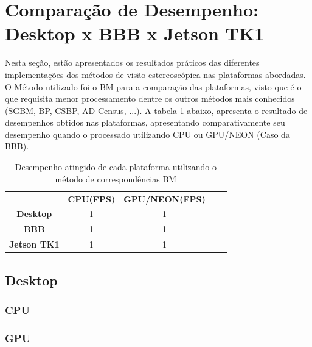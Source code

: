 \section{Comparação de Desempenho: Desktop x BBB x Jetson TK1}

Nesta seção, estão apresentados os resultados práticos das diferentes implementações dos métodos de visão estereoscópica nas plataformas abordadas. O Método utilizado foi o BM para a comparação das plataformas, visto que é o que requisita menor processamento dentre os outros métodos mais conhecidos (SGBM, BP, CSBP, AD Census, ...). A tabela \ref{resultsCPUGPU} abaixo, apresenta o resultado de desempenhos obtidos nas plataformas, apresentando comparativamente seu desempenho quando o processado utilizando CPU ou GPU/NEON (Caso da BBB).

\begin{table}[]
\centering
\caption{Desempenho atingido de cada plataforma utilizando o método de correspondências BM}
\label{resultsCPUGPU}
\begin{tabular}{c|c|c|ll}
\cline{2-3}
                                          & \textbf{CPU(FPS)} & \textbf{GPU/NEON(FPS)} &  &  \\ \cline{1-3}
\multicolumn{1}{|c|}{\textbf{Desktop}}    & 1                 & 1                      &  &  \\ \cline{1-3}
\multicolumn{1}{|c|}{\textbf{BBB}}        & 1                 & 1                      &  &  \\ \cline{1-3}
\multicolumn{1}{|c|}{\textbf{Jetson TK1}} & 1                 & 1                      &  &  \\ \cline{1-3}
\end{tabular}
\end{table}


\subsection{Desktop}
\subsubsection{CPU}
\subsubsection{GPU}


